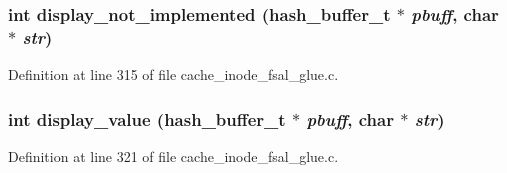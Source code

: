\subsubsection{\setlength{\rightskip}{0pt plus 5cm}int display\_\-not\_\-implemented (hash\_\-buffer\_\-t $\ast$ {\em pbuff}, char $\ast$ {\em str})}\label{cache__inode__fsal__glue_8c_a3}




Definition at line 315 of file cache\_\-inode\_\-fsal\_\-glue.c.
\subsubsection{\setlength{\rightskip}{0pt plus 5cm}int display\_\-value (hash\_\-buffer\_\-t $\ast$ {\em pbuff}, char $\ast$ {\em str})}\label{cache__inode__fsal__glue_8c_a4}




Definition at line 321 of file cache\_\-inode\_\-fsal\_\-glue.c.